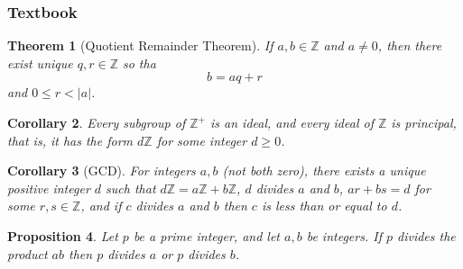 \documentclass[12pt]{article}
\newtheorem{thm}{Theorem}[section]
\newtheorem{cor}[thm]{Corollary}
\newtheorem{prop}[thm]{Proposition}
\theoremstyle{definition}
\theoremstyle{remark}
\numberwithin{equation}{section}
\newcommand\Z{\mathbb Z}    %
\begin{document}
\subsubsection{Textbook}


\begin{thm}[Quotient Remainder Theorem]
        If $a,b \in \Z$ and $a \neq 0$, then there exist unique $q,r \in \Z$ so tha \begin{equation}
                b = aq + r
        \end{equation}
        and $0 \leq r < |a|$. 
\end{thm}

\vspace{15pt}

\begin{cor}
        Every subgroup of $\Z^+$ is an ideal, and every ideal of $\Z$ is principal, that is, it has the form $d\Z$ for some integer $d \geq 0$.
\end{cor}

\vspace{15pt}

\begin{cor}[GCD]
        For integers $a,b$ (not both zero), there exists a unique positive integer $d$ such that $d\Z = a\Z + b\Z$, $d$ divides $a$ and $b$, $ar+bs = d$ for some $r,s \in \Z$, and if $c$ divides $a$ and $b$ then $c$ is less than or equal to $d$.
\end{cor}

\vspace{15pt}

\begin{prop}
        Let $p$ be a prime integer, and let $a,b$ be integers. If $p$ divides the product $ab$ then $p$ divides $a$ or $p$ divides $b$.
\end{prop}

\vspace{15pt}
\end{document}
